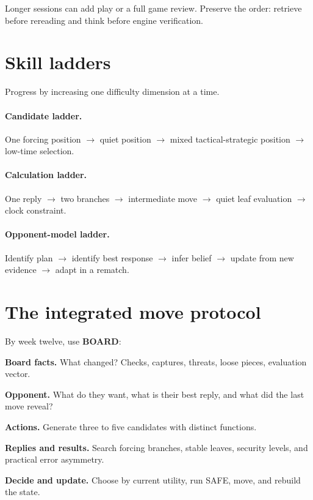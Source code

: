 Longer sessions can add play or a full game review. Preserve the order: retrieve before rereading and think before engine verification.

\section{Skill ladders}
Progress by increasing one difficulty dimension at a time.

\paragraph{Candidate ladder.}
One forcing position $\rightarrow$ quiet position $\rightarrow$ mixed tactical-strategic position $\rightarrow$ low-time selection.

\paragraph{Calculation ladder.}
One reply $\rightarrow$ two branches $\rightarrow$ intermediate move $\rightarrow$ quiet leaf evaluation $\rightarrow$ clock constraint.

\paragraph{Opponent-model ladder.}
Identify plan $\rightarrow$ identify best response $\rightarrow$ infer belief $\rightarrow$ update from new evidence $\rightarrow$ adapt in a rematch.

\section{The integrated move protocol}
By week twelve, use \textbf{BOARD}:

\begin{description}[style=multiline,leftmargin=3.2em,labelwidth=2.5em]
\item[B] \textbf{Board facts.} What changed? Checks, captures, threats, loose pieces, evaluation vector.
\item[O] \textbf{Opponent.} What do they want, what is their best reply, and what did the last move reveal?
\item[A] \textbf{Actions.} Generate three to five candidates with distinct functions.
\item[R] \textbf{Replies and results.} Search forcing branches, stable leaves, security levels, and practical error asymmetry.
\item[D] \textbf{Decide and update.} Choose by current utility, run SAFE, move, and rebuild the state.
\end{description}

